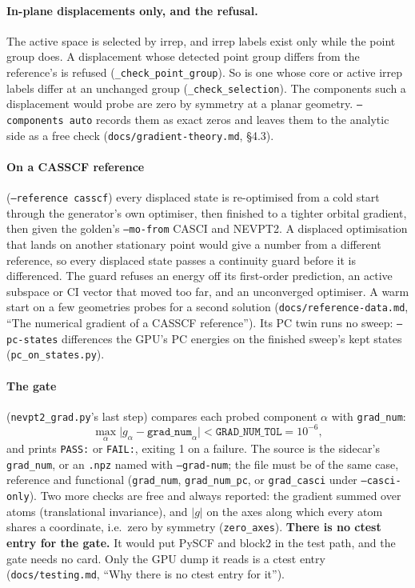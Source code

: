 \documentclass[11pt]{article}
\newcommand{\code}[1]{\texttt{#1}}
\begin{document}
\paragraph{In-plane displacements only, and the refusal.} The active space is
selected by irrep, and irrep labels exist only while the point group does. A
displacement whose detected point group differs from the reference's is
refused (\code{\_check\_point\_group}). So is one whose core or active irrep
labels differ at an unchanged group (\code{\_check\_selection}). The
components such a displacement would probe are zero by symmetry at a planar
geometry. \code{--components auto} records them as exact zeros and leaves them
to the analytic side as a free check (\code{docs/gradient-theory.md}, \S4.3).

\paragraph{On a CASSCF reference} (\code{--reference casscf}) every displaced
state is re-optimised from a cold start through the generator's own optimiser,
then finished to a tighter orbital gradient, then given the golden's
\code{--mo-from} CASCI and NEVPT2. A displaced optimisation that lands on
another stationary point would give a number from a different reference, so
every displaced state passes a continuity guard before it is differenced. The
guard refuses an energy off its first-order prediction, an active subspace or
CI vector that moved too far, and an unconverged optimiser. A warm start on a
few geometries probes for a second solution (\code{docs/reference-data.md},
``The numerical gradient of a CASSCF reference''). Its PC twin runs no sweep:
\code{--pc-states} differences the GPU's PC energies on the finished sweep's
kept states (\code{pc\_on\_states.py}).

\paragraph{The gate} (\code{nevpt2\_grad.py}'s last step) compares each probed
component $\alpha$ with \code{grad\_num}:
\begin{equation}
  \max_\alpha \bigl|g_\alpha - \code{grad\_num}_\alpha\bigr| < \code{GRAD\_NUM\_TOL} = 10^{-6},
  \label{eq:gate}
\end{equation}
and prints \code{PASS:} or \code{FAIL:}, exiting 1 on a failure. The source is
the sidecar's \code{grad\_num}, or an \code{.npz} named with
\code{--grad-num}; the file must be of the same case, reference and functional
(\code{grad\_num}, \code{grad\_num\_pc}, or \code{grad\_casci} under
\code{--casci-only}). Two more checks are free and always reported: the
gradient summed over atoms (translational invariance), and $|g|$ on the axes
along which every atom shares a coordinate, i.e.\ zero by symmetry
(\code{zero\_axes}). \textbf{There is no ctest entry for the gate.} It would put
PySCF and block2 in the test path, and the gate needs no card. Only the GPU dump
it reads is a ctest entry (\code{docs/testing.md}, ``Why there is no ctest entry
for it'').
\end{document}
